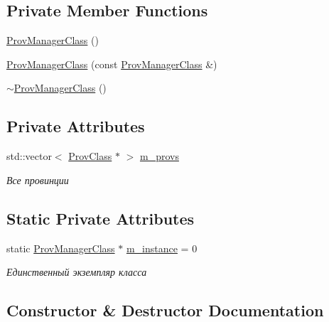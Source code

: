 \subsection*{Private Member Functions}
\begin{DoxyCompactItemize}
\item 
\hyperlink{class_prov_manager_class_a974d1f4e6ad4e826cd493423fb9496a3}{Prov\+Manager\+Class} ()
\item 
\hyperlink{class_prov_manager_class_ace57181bd64e4fdcb4a196f62e35ecd5}{Prov\+Manager\+Class} (const \hyperlink{class_prov_manager_class}{Prov\+Manager\+Class} \&)
\item 
\hyperlink{class_prov_manager_class_afdd9bfc8239e4e14f5a9862ee712d44d}{$\sim$\+Prov\+Manager\+Class} ()
\end{DoxyCompactItemize}
\subsection*{Private Attributes}
\begin{DoxyCompactItemize}
\item 
std\+::vector$<$ \hyperlink{class_prov_class}{Prov\+Class} $\ast$ $>$ \hyperlink{class_prov_manager_class_a112642cf6b7476f89373c6ac796e3375}{m\+\_\+provs}
\begin{DoxyCompactList}\small\item\em Все провинции \end{DoxyCompactList}\end{DoxyCompactItemize}
\subsection*{Static Private Attributes}
\begin{DoxyCompactItemize}
\item 
static \hyperlink{class_prov_manager_class}{Prov\+Manager\+Class} $\ast$ \hyperlink{class_prov_manager_class_a825e74c565a9c73901d75eb9e0cf5975}{m\+\_\+instance} = 0
\begin{DoxyCompactList}\small\item\em Единственный экземпляр класса \end{DoxyCompactList}\end{DoxyCompactItemize}


\subsection{Constructor \& Destructor Documentation}
\mbox{\label{class_prov_manager_class_a974d1f4e6ad4e826cd493423fb9496a3}} 
